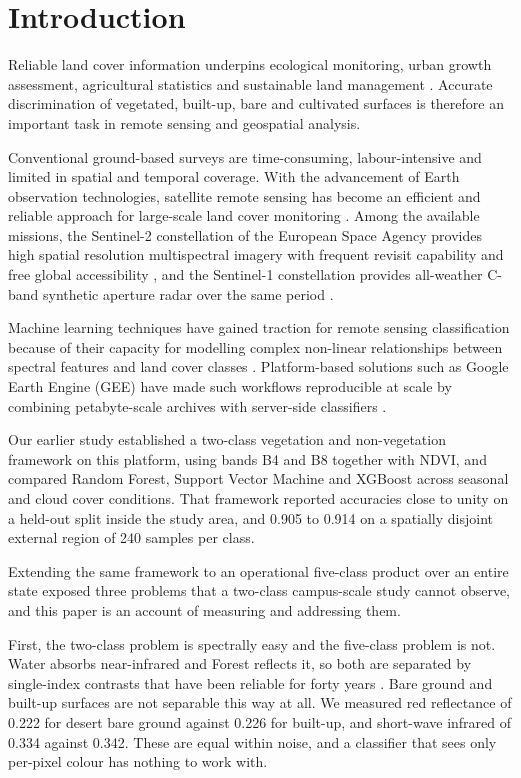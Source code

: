 \documentclass[conference]{IEEEtran}
\begin{document}
\section{Introduction}

Reliable land cover information underpins ecological monitoring, urban
growth assessment, agricultural statistics and sustainable land
management \cite{ref1,ref3}. Accurate discrimination of vegetated,
built-up, bare and cultivated surfaces is therefore an important task in
remote sensing and geospatial analysis.

Conventional ground-based surveys are time-consuming, labour-intensive
and limited in spatial and temporal coverage. With the advancement of
Earth observation technologies, satellite remote sensing has become an
efficient and reliable approach for large-scale land cover monitoring
\cite{ref4}. Among the available missions, the Sentinel-2 constellation
of the European Space Agency provides high spatial resolution
multispectral imagery with frequent revisit capability and free global
accessibility \cite{ref4,ref5}, and the Sentinel-1 constellation
provides all-weather C-band synthetic aperture radar over the same
period \cite{ref20}.

Machine learning techniques have gained traction for remote sensing
classification because of their capacity for modelling complex
non-linear relationships between spectral features and land cover
classes \cite{ref7,ref8,ref9,ref10}. Platform-based solutions such as Google
Earth Engine (GEE) have made such workflows reproducible at scale by
combining petabyte-scale archives with server-side classifiers
\cite{ref11,ref12,ref13}.

Our earlier study established a two-class vegetation and non-vegetation
framework on this platform, using bands B4 and B8 together with NDVI,
and compared Random Forest, Support Vector Machine and XGBoost across
seasonal and cloud cover conditions. That framework reported accuracies
close to unity on a held-out split inside the study area, and 0.905 to
0.914 on a spatially disjoint external region of 240 samples per class.

Extending the same framework to an operational five-class product over
an entire state exposed three problems that a two-class campus-scale
study cannot observe, and this paper is an account of measuring and
addressing them.

First, the two-class problem is spectrally easy and the five-class
problem is not. Water absorbs near-infrared and Forest reflects it, so
both are separated by single-index contrasts that have been reliable for
forty years \cite{ref1,ref2}. Bare ground and built-up surfaces are not
separable this way at all. We measured red reflectance of 0.222 for
desert bare ground against 0.226 for built-up, and short-wave infrared
of 0.334 against 0.342. These are equal within noise, and a classifier
that sees only per-pixel colour has nothing to work with.
\end{document}
